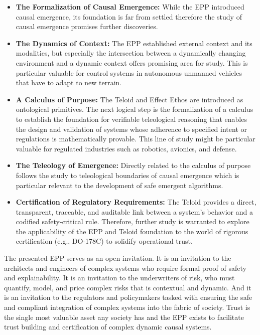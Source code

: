\begin{itemize}
	\item \textbf{The Formalization of Causal Emergence:} While the EPP introduced causal emergence, its foundation is far from settled therefore the study of causal emergence promises further discoveries.
	\item \textbf{The Dynamics of Context:} The EPP established external context and its modalities, but especially the intersection between a dynamically changing environment and a dynamic context offers promising area for study. This is particular valuable for control systems in autonomous unmanned vehicles that have to adapt to new terrain. 
	\item \textbf{A Calculus of Purpose:} The Teloid and Effect Ethos are introduced as ontological primitives. The next logical step is the formalization of a calculus to establish the foundation for verifiable teleological reasoning that enables the design and validation of systems whose adherence to specified intent or regulations is mathematically provable. This line of study might be particular valuable for regulated industries such as robotics, avionics, and defense. 
	\item \textbf{The Teleology of Emergence:} Directly related to the calculus of purpose follows the study to teleological boundaries of causal emergence which is particular relevant to the development of safe emergent algorithms. 
	\item \textbf{Certification of Regulatory Requirements:} The Teloid provides a direct, transparent, traceable, and auditable link between a system's behavior and a codified safety-critical rule. Therefore, further study is warranted to explore the applicability of the EPP and Teloid foundation to the world of rigorous certification (e.g., DO-178C) to solidify operational trust.  
\end{itemize}


The presented EPP serves as an open invitation. It is an invitation to the architects and engineers of complex systems who require formal proof of safety and explainability. It is an invitation to the underwriters of risk, who must quantify, model, and price complex risks that is contextual and dynamic. And it is an invitation to the regulators and policymakers tasked with ensuring the safe and compliant integration of complex systems into the fabric of society. Trust is the single most valuable asset any society has and the EPP exists to facilitate trust building and certification of complex dynamic causal systems. 

\newpage